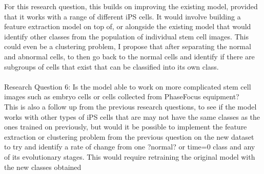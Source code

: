 {For this research question, this builds on improving the existing model, provided that it works with a range of different iPS cells. It would involve building a feature extraction model on top of, or alongside the existing model that would identify other classes from the population of individual stem cell images. This could even be a clustering problem, I propose that after separating the normal and abnormal cells, to then go back to the normal cells and identify if there are subgroups of cells that exist that can be classified into its own class. \\ \\ 
Research Question 6: Is the model able to work on more complicated stem cell images such as embryo cells or cells collected from PhaseFocus equipment? \\ 
This is also a follow up from the previous research questions, to see if the model works with other types of iPS cells that are may not have the same classes as the ones trained on previously, but would it be possible to implement the feature extraction or clustering problem from the previous question on the new dataset to try and identify a rate of change from one ?normal? or time=0 class and any of its evolutionary stages. This would require retraining the original model with the new classes obtained
}

